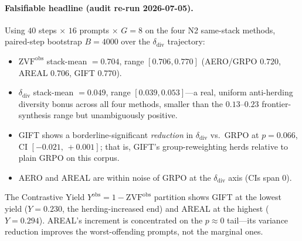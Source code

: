 \paragraph{Falsifiable headline (audit re-run 2026-07-05).}
Using $40$ steps $\times$ $16$ prompts $\times$ $G=8$ on the four
N2 same-stack methods, paired-step bootstrap $B=4000$ over the
$\delta_{\mathrm{div}}$ trajectory:
\begin{itemize}
  \item $\mathrm{ZVF}^{\mathrm{obs}}$ stack-mean $=0.704$, range
        $[0.706, 0.770]$ (AERO/GRPO $0.720$, AREAL $0.706$, GIFT $0.770$).
  \item $\delta_{\mathrm{div}}$ stack-mean $=\mathbf{0.049}$, range
        $[0.039, 0.053]$---a real, uniform anti-herding diversity bonus
        across all four methods, smaller than the $0.13$--$0.23$
        frontier-synthesis range but unambiguously positive.
  \item GIFT shows a borderline-significant \emph{reduction} in
        $\delta_{\mathrm{div}}$ vs.\ GRPO at $p=0.066$, CI
        $[-0.021,\,+0.001]$; that is, GIFT's group-reweighting herds
        relative to plain GRPO on this corpus.
  \item AERO and AREAL are within noise of GRPO at the
        $\delta_{\mathrm{div}}$ axis (CIs span $0$).
\end{itemize}
The Contrastive Yield $Y^{\mathrm{obs}} = 1 - \mathrm{ZVF}^{\mathrm{obs}}$
partition shows GIFT at the lowest yield ($Y=0.230$, the
herding-increased end) and AREAL at the highest ($Y=0.294$). AREAL's
increment is concentrated on the $p\approx 0$ tail---its variance
reduction improves the worst-offending prompts, not the marginal ones.

